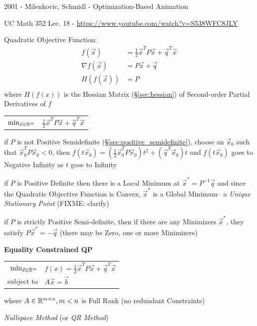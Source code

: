 2001 - Milenkovic, Schmidl - Optimization-Based Animation

UC Math 352 Lec. 18 - \url{https://www.youtube.com/watch?v=S538WFC8JLY}

Quadratic Objective Function:
\begin{align*}
  f(\vec{x})        & = \frac{1}{2}\vec{x}^T P \vec{x} + \vec{q}^T\vec{x} \\
  \nabla f(\vec{x}) & = P\vec{x} + \vec{q} \\
  H(f(\vec{x}))     & = P \\
\end{align*}
where $H(f(x))$ is the Hessian Matrix (\S\ref{sec:hessian}) of
Second-order Partial Derivatives of $f$

\begin{tabular}{r l}
  $\mathrm{min}_{\vec{x} \in \mathbb{R}^m}$ &
    $\frac{1}{2}\vec{x}^T P\vec{x} + \vec{q}^T\vec{x}$ \\
\end{tabular}

if $P$ is not Positive Semidefinite (\S\ref{sec:positive_semidefinite}), choose
an $\vec{x}_0$ such that $\vec{x}_0^T P\vec{x}_0 < 0$, then
$f(t\vec{x}_0) = (\frac{1}{2}\vec{x}_0^TP\vec{x}_0)t^2 + (\vec{q}^T\vec{x}_0)t$
and $f(t\vec{x}_0)$ goes to Negative Infinity as $t$ goes to Infinity

if $P$ is Positive Definite then there is a Local Minimum at $\vec{x}^* =
P^{-1}\vec{q}$ and since the Quadratic Objective Function is Convex,
$\vec{x}^*$ is a Global Minimum-- a \emph{Unique Stationary Point} (FIXME:
clarify)

if $P$ is strictly Positive Semi-definite, then if there are any Minimizers
$\vec{x}^*$, they satisfy $P\vec{x}^* = - \vec{q}$ (there may be Zero, one or
more Minimizers)


\textbf{Equality Constrained QP}

\begin{tabular}{r l}
  $\mathrm{min}_{\vec{x} \in \mathbb{R}^m}$ &
    $f(x) = \frac{1}{2}\vec{x}^T P\vec{x} + \vec{q}^T\vec{x}$ \\
  subject to & $A\vec{x} = \vec{b}$ \\
\end{tabular}

where $A \in \mathbb{R}^{m \times n}, m < n$ is Full Rank (no redundant
Constraints)

\emph{Nullspace Method} (or \emph{QR Method})

